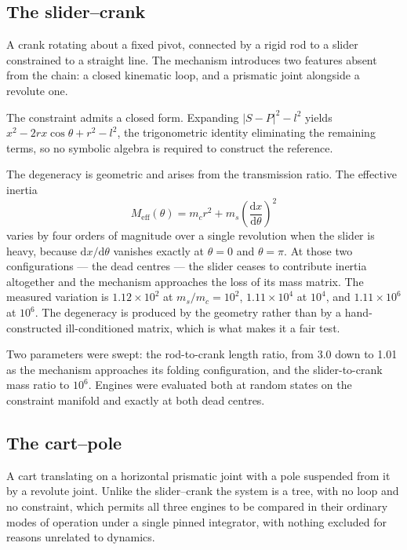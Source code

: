 \documentclass[review,12pt]{elsarticle}
\begin{document}
\subsection{The slider--crank}
A crank rotating about a fixed pivot, connected by a rigid rod to a slider
constrained to a straight line. The mechanism introduces two features absent
from the chain: a closed kinematic loop, and a prismatic joint alongside a
revolute one.

The constraint admits a closed form. Expanding $|S-P|^2 - l^2$ yields
$x^2 - 2rx\cos\theta + r^2 - l^2$, the trigonometric identity eliminating the
remaining terms, so no symbolic algebra is required to construct the reference.

The degeneracy is geometric and arises from the transmission ratio. The
effective inertia
\begin{equation}
M_{\mathrm{eff}}(\theta) = m_c r^2 + m_s\left(\frac{\mathrm{d}x}{\mathrm{d}\theta}\right)^2
\label{eq:meff}
\end{equation}
varies by four orders of magnitude over a single revolution when the slider is
heavy, because $\mathrm{d}x/\mathrm{d}\theta$ vanishes exactly at $\theta=0$ and
$\theta=\pi$. At those two configurations --- the dead centres --- the slider
ceases to contribute inertia altogether and the mechanism approaches the loss of
its mass matrix. The measured variation is $1.12\times10^{2}$ at
$m_s/m_c = 10^{2}$, $1.11\times10^{4}$ at $10^{4}$, and $1.11\times10^{6}$ at
$10^{6}$. The degeneracy is produced by the geometry rather than by a
hand-constructed ill-conditioned matrix, which is what makes it a fair test.

Two parameters were swept: the rod-to-crank length ratio, from 3.0 down to 1.01
as the mechanism approaches its folding configuration, and the slider-to-crank
mass ratio to $10^{6}$. Engines were evaluated both at random states on the
constraint manifold and exactly at both dead centres.

\subsection{The cart--pole}
A cart translating on a horizontal prismatic joint with a pole suspended from it
by a revolute joint. Unlike the slider--crank the system is a tree, with no loop
and no constraint, which permits all three engines to be compared in their
ordinary modes of operation under a single pinned integrator, with nothing
excluded for reasons unrelated to dynamics.
\end{document}
